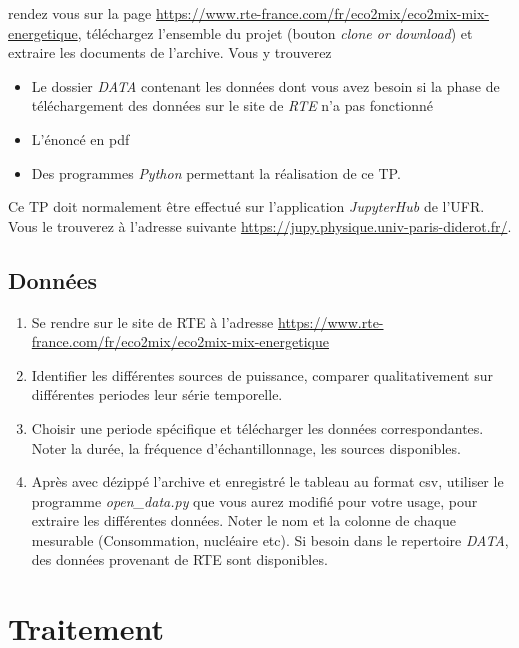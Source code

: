 \documentclass{article}
\newcommand{\tmtextit}[1]{{\itshape{#1}}}
\begin{document}
rendez vous sur la page
\href{}{https://www.rte-france.com/fr/eco2mix/eco2mix-mix-energetique},
téléchargez l'ensemble du projet (bouton \tmtextit{clone or download}) et
extraire les documents de l'archive. Vous y trouverez
\begin{itemize}
  \item Le dossier \tmtextit{DATA} contenant les données dont vous avez
  besoin si la phase de téléchargement des données sur le site de
  \tmtextit{RTE} n'a pas fonctionné
  
  \item L'énoncé en pdf
  
  \item Des programmes \tmtextit{Python} permettant la réalisation de ce TP.
\end{itemize}
Ce TP doit normalement être effectué sur l'application \tmtextit{JupyterHub}
de l'UFR. Vous le trouverez à l'adresse suivante
\href{https://jupy.physique.univ-paris-diderot.fr/}{https://jupy.physique.univ-paris-diderot.fr/}.

\subsection{Données}

\begin{enumerate}
  \item Se rendre sur le site de RTE à l'adresse
  \href{}{https://www.rte-france.com/fr/eco2mix/eco2mix-mix-energetique}
  
  \item Identifier les différentes sources de puissance, comparer
  qualitativement sur différentes periodes leur série temporelle.
  
  \item Choisir une periode spécifique et télécharger les données
  correspondantes. Noter la durée, la fréquence d'échantillonnage, les
  sources disponibles.
  
  \item Après avec dézippé l'archive et enregistré le tableau au format
  csv, utiliser le programme \tmtextit{open\_data.py} que vous aurez modifié
  pour votre usage, pour extraire les différentes données. Noter le nom et
  la colonne de chaque mesurable (Consommation, nucléaire etc). Si besoin
  dans le repertoire \tmtextit{DATA}, des données provenant de RTE sont
  disponibles.
\end{enumerate}

\section{Traitement}
\end{document}
